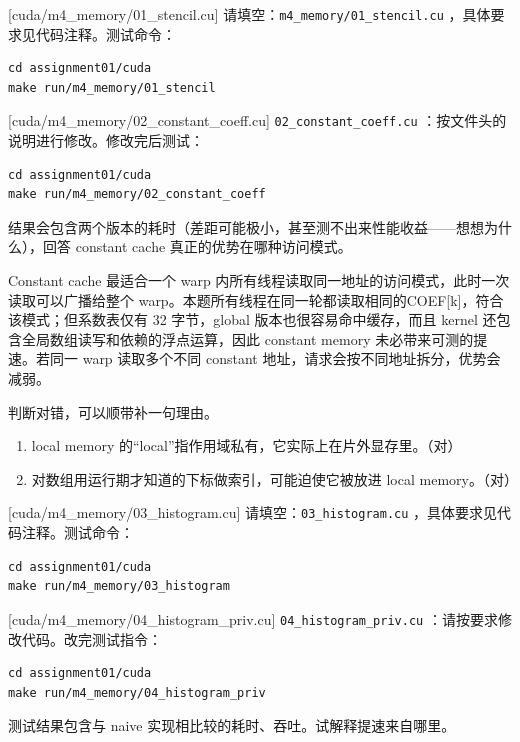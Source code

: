 \documentclass[11pt,a4paper,fontset=none]{ctexart}
\begin{document}
[cuda/m4\_memory/01\_stencil.cu]
请填空：\texttt{m4\_memory/01\_stencil.cu} ，具体要求见代码注释。测试命令：

\begin{lstlisting}
cd assignment01/cuda
make run/m4_memory/01_stencil
\end{lstlisting}

[cuda/m4\_memory/02\_constant\_coeff.cu]
\texttt{02\_constant\_coeff.cu} ：按文件头的说明进行修改。修改完后测试：

\begin{lstlisting}
cd assignment01/cuda
make run/m4_memory/02_constant_coeff
\end{lstlisting}

结果会包含两个版本的耗时（差距可能极小，甚至测不出来性能收益——想想为什么），回答 constant cache 真正的优势在哪种访问模式。

Constant cache 最适合一个 warp 内所有线程读取同一地址的访问模式，此时一次读取可以广播给整个 warp。本题所有线程在同一轮都读取相同的COEF[k]，符合该模式；但系数表仅有 32 字节，global 版本也很容易命中缓存，而且 kernel 还包含全局数组读写和依赖的浮点运算，因此 constant memory 未必带来可测的提速。若同一 warp 读取多个不同 constant 地址，请求会按不同地址拆分，优势会减弱。

判断对错，可以顺带补一句理由。
\begin{enumerate}[label=(\alph*)]
  \item local memory 的“local”指作用域私有，它实际上在片外显存里。（对）
  \item 对数组用运行期才知道的下标做索引，可能迫使它被放进 local memory。（对）
\end{enumerate}

[cuda/m4\_memory/03\_histogram.cu]
请填空：\texttt{03\_histogram.cu} ，具体要求见代码注释。测试命令：

\begin{lstlisting}
cd assignment01/cuda
make run/m4_memory/03_histogram
\end{lstlisting}

[cuda/m4\_memory/04\_histogram\_priv.cu]
\texttt{04\_histogram\_priv.cu} ：请按要求修改代码。改完测试指令：

\begin{lstlisting}
cd assignment01/cuda
make run/m4_memory/04_histogram_priv
\end{lstlisting}

测试结果包含与 naive 实现相比较的耗时、吞吐。试解释提速来自哪里。
\end{document}
